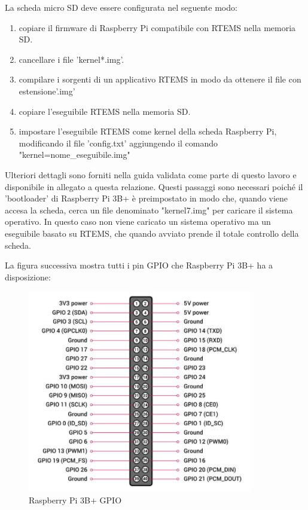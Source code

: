 \documentclass[12pt, a4paper, titlepage, oneside]{book}
\begin{document}
La scheda micro SD deve essere configurata nel seguente modo:
\newline
\begin{enumerate}
    \item copiare il firmware di Raspberry Pi compatibile con RTEMS nella memoria SD.
    \item cancellare i file 'kernel*.img'. 
    \item compilare i sorgenti di un applicativo RTEMS in modo da ottenere il file con estensione'.img' 
    \item copiare l'eseguibile RTEMS nella memoria SD.
    \item \parbox[t]{\linewidth}{impostare l'eseguibile RTEMS come kernel della scheda Raspberry Pi, modificando il file 'config.txt' aggiungendo il comando "kernel=nome\_eseguibile.img"}
\end{enumerate}

Ulteriori dettagli sono forniti nella guida validata come parte di questo lavoro e disponibile in allegato a questa relazione.
Questi passaggi sono necessari poiché il 'bootloader' di Raspberry Pi 3B+ è preimpostato in modo che, quando viene accesa la scheda, cerca un file denominato "kernel7.img" per caricare il sistema operativo. In questo caso non viene caricato un sistema operativo ma un eseguibile basato su RTEMS, che quando avviato prende il totale controllo della scheda.

\newpage
La figura successiva mostra tutti i pin GPIO che Raspberry Pi 3B+ ha a disposizione:
\begin{figure}[h]
    \centering
    \includegraphics[scale = 1.40]{RPi3B_GPIO.JPG}
    \caption{Raspberry Pi 3B+ GPIO}
    \label{fig:RPi3B_GPIO}
\end{figure}
\end{document}
